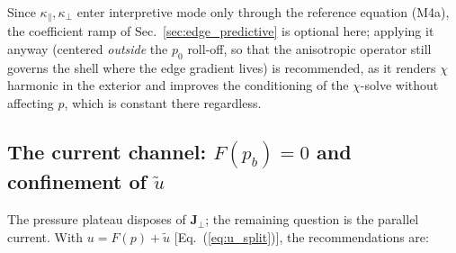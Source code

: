 \documentclass[english]{article}
\newcommand{\bJ}{\mathbf{J}}
\begin{document}
Since $\kappa_\parallel,\kappa_\perp$ enter interpretive mode only through the reference
equation (M4a), the coefficient ramp of Sec.~\ref{sec:edge_predictive} is optional here; applying
it anyway (centered \emph{outside} the $p_0$ roll-off, so that the anisotropic operator still
governs the shell where the edge gradient lives) is recommended, as it renders $\chi$ harmonic in
the exterior and improves the conditioning of the $\chi$-solve without affecting $p$, which is
constant there regardless.

\subsection{The current channel: $F(p_b)=0$ and confinement of $\tilde u$}
\label{sec:edge_current}

The pressure plateau disposes of $\bJ_\perp$; the remaining question is the parallel current.
With $u=F(p)+\tilde u$ [Eq.~(\ref{eq:u_split})], the recommendations are:
\end{document}
